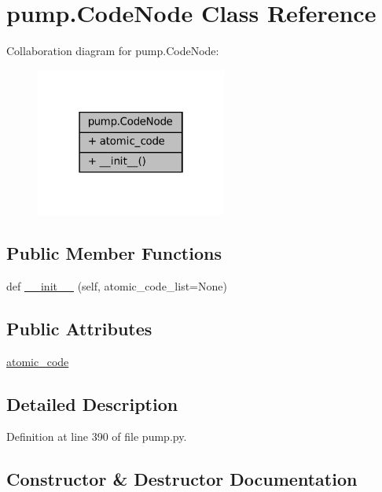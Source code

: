 \hypertarget{classpump_1_1CodeNode}{}\section{pump.\+Code\+Node Class Reference}
\label{classpump_1_1CodeNode}


Collaboration diagram for pump.\+Code\+Node\+:
\nopagebreak
\begin{figure}[H]
\begin{center}
\leavevmode
\includegraphics[width=178pt]{classpump_1_1CodeNode__coll__graph}
\end{center}
\end{figure}
\subsection*{Public Member Functions}
\begin{DoxyCompactItemize}
\item 
def \hyperlink{classpump_1_1CodeNode_a2ca8a75324a64e48004812d6c0bc1cbd}{\+\_\+\+\_\+init\+\_\+\+\_\+} (self, atomic\+\_\+code\+\_\+list=None)
\end{DoxyCompactItemize}
\subsection*{Public Attributes}
\begin{DoxyCompactItemize}
\item 
\hyperlink{classpump_1_1CodeNode_ac7251110cc987c709e0e17d95521993e}{atomic\+\_\+code}
\end{DoxyCompactItemize}


\subsection{Detailed Description}


Definition at line 390 of file pump.\+py.



\subsection{Constructor \& Destructor Documentation}
\mbox{\label{classpump_1_1CodeNode_a2ca8a75324a64e48004812d6c0bc1cbd}} 
